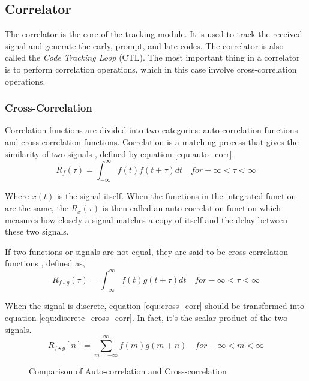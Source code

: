 \subsection{Correlator}
The correlator is the core of the tracking module. It is used to track the received signal and generate the early, prompt, and late codes. The correlator is also called the \textit{Code Tracking Loop} (CTL). The most important thing in a correlator is to perform correlation operations, which in this case involve cross-correlation operations.

\subsubsection{Cross-Correlation}
Correlation functions are divided into two categories: auto-correlation functions and cross-correlation functions.
Correlation is a matching process that gives the similarity of two signals \cite{RN202}, defined by equation \ref{equ:auto_corr}.
\begin{equation}
    R_f(\tau)=\int_{-\infty}^{\infty}f(t)f(t+\tau)dt \quad for -\infty<\tau<\infty
    \label{equ:auto_corr}
\end{equation}

Where $x(t)$ is the signal itself. When the functions in the integrated function are the same, the $R_x(\tau)$ is then called an auto-correlation function which measures how closely a signal matches a copy of itself and the delay between these two signals.

If two functions or signals are not equal, they are said to be cross-correlation functions \cite{RN201}, defined as,
\begin{equation}
    R_{f\star g}(\tau)=\int_{-\infty}^{\infty}f(t)g(t+\tau)dt \quad for -\infty<\tau<\infty
    \label{equ:cross_corr}
\end{equation}

When the signal is discrete, equation \ref{equ:cross_corr} should be transformed into equation \ref{equ:discrete_cross_corr}. In fact, it's the scalar product of the two signals. 
\begin{equation}
    R_{f\star g}[n]=\sum_{m=-\infty}^{\infty}f(m)g(m+n) \quad for -\infty<m<\infty
    \label{equ:discrete_cross_corr}
\end{equation}

\begin{figure}[!htbp]
    \centering
    
    \caption{Comparison of Auto-correlation and Cross-correlation}
    \label{fig:corre_function}
\end{figure}


